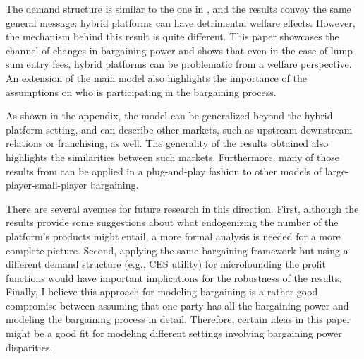 The demand structure is similar to the one in \textcite{anderson2021hybrid}, and the results convey the same general message: hybrid platforms can have detrimental welfare effects.
However, the mechanism behind this result is quite different.
This paper showcases the channel of changes in bargaining power and shows that even in the case of lump-sum entry fees, hybrid platforms can be problematic from a welfare perspective.
An extension of the main model also highlights the importance of the assumptions on who is participating in the bargaining process.

As shown in the appendix, the model can be generalized beyond the hybrid platform setting, and can describe other markets, such as upstream-downstream relations or franchising, as well.
The generality of the results obtained also highlights the similarities between such markets.
Furthermore, many of those results from can be applied in a plug-and-play fashion to other models of large-player-small-player bargaining.

There are several avenues for future research in this direction.
First, although the results provide some suggestions about what endogenizing the number of the platform's products might entail, a more formal analysis is needed for a more complete picture.
Second, applying the same bargaining framework but using a different demand structure (e.g., CES utility) for microfounding the profit functions would have important implications for the robustness of the results.
Finally, I believe this approach for modeling bargaining is a rather good compromise between assuming that one party has all the bargaining power and modeling the bargaining process in detail.
Therefore, certain ideas in this paper might be a good fit for modeling different settings involving bargaining power disparities.
